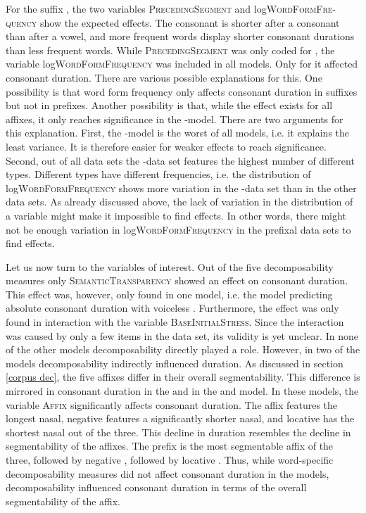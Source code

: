 For the suffix , the two variables \textsc{PrecedingSegment} and log\textsc{WordFormFre-quency} show the expected effects. The consonant is shorter after a consonant than after a vowel, and more frequent words display shorter consonant durations than less frequent words. While \textsc{PrecedingSegment} was only coded for , the variable log\textsc{WordFormFrequency} was included in all models. Only for  it affected consonant duration. There are various possible explanations for this. 
One possibility is that word form frequency only affects consonant duration in suffixes but not in prefixes. Another possibility is that, while the effect exists for all affixes, it only reaches significance in the -model. There are two arguments for this explanation.
 First, the -model is the worst of all models, i.e. it explains the least variance. It is therefore easier for weaker effects to reach significance. 
 Second, out of all data sets the -data set features the highest number of different types. Different types have different frequencies, i.e. the distribution of log\textsc{WordFormFrequency} shows more variation in the -data set than in the other data sets. As already discussed above, the lack of variation in the distribution of a variable might make it impossible to find effects. In other words, there might not be enough variation in log\textsc{WordFormFrequency} in the prefixal data sets to find effects.


Let us now turn to the variables of interest. Out of the five decomposability measures only \textsc{SemanticTransparency} showed an effect on consonant duration. This effect was, however, only found in one model, i.e. the model predicting absolute consonant duration with voiceless .  Furthermore, the effect was only found in interaction with the variable \textsc{BaseInitialStress}. Since the interaction was caused by only a few items in the data set, its validity is yet unclear. 
In none of the other models decomposability directly played a role. 
However, in two of the models decomposability indirectly influenced duration. As discussed in section \ref{corpus dec}, the five affixes differ in their overall segmentability. This difference is mirrored in consonant duration in the  and in the  and  model. In these models, the variable \textsc{Affix} significantly affects consonant duration. The affix  features the longest nasal, negative  features a significantly shorter nasal, and locative  has the shortest nasal out of the three. This decline in duration resembles the decline in segmentability of the affixes. The prefix  is the most segmentable affix of the three, followed by negative , followed by locative . Thus, while word-specific decomposability measures did not affect consonant duration in the models, decomposability influenced consonant duration in terms of the overall segmentability of the affix.


